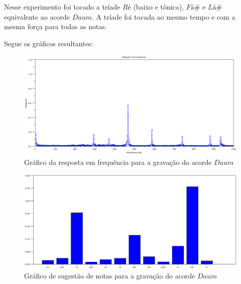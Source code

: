 Nesse experimento foi tocado a tríade $Ré$ (baixo e tônica), $Fá\#$ e $Lá\#$ equivalente ao acorde $Daum$. A tríade foi tocada ao mesmo tempo e com a mesma força para todas as notas.

Segue os gráficos resultantes:

\begin{figure}[h]
	\centering
		\includegraphics[keepaspectratio=true,scale=0.49]{figuras/Dm/fft_Daum.eps}
	\caption{Gráfico da resposta em frequência para a gravação do acorde $Daum$}
\end{figure}

\begin{figure}[h]
	\centering
		\includegraphics[keepaspectratio=true,scale=0.49]{figuras/Dm/notas_Daum.eps}
	\caption{Gráfico de sugestão de notas para a gravação do acorde $Daum$}
\end{figure}

